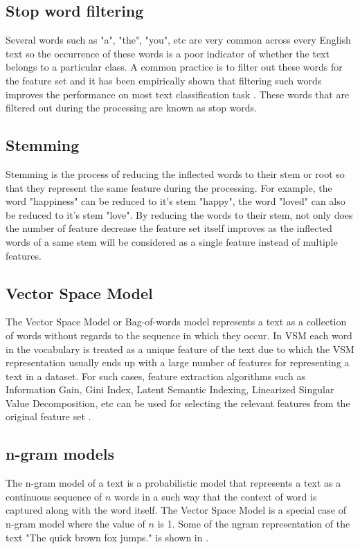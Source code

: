 \subsection{Stop word filtering}
Several words such as "a", "the", "you", etc are very common across every English text so the occurrence of these words is a poor indicator of whether the text belongs to a particular class. A common practice is to filter out these words for the feature set and it has been empirically shown that filtering such words improves the performance on most text classification task \cite{silva2003importance}. These words that are filtered out during the processing are known as stop words. 

\subsection{Stemming}
Stemming is the process of reducing the inflected words to their stem or root so that they represent the same feature during the processing. For example, the word "happiness" can be reduced to it's stem "happy", the word "loved" can also be reduced to it's stem "love". By reducing the words to their stem, not only does the number of feature decrease the feature set itself improves as the inflected words of a same stem will be considered as a single feature instead of multiple features. 

\subsection{Vector Space Model}
The Vector Space Model or Bag-of-words model represents a text as a collection of words without regards to the sequence in which they occur. In VSM each word in the vocabulary is treated as a unique feature of the text due to which the VSM representation usually ends up with a large number of features for representing a text in a dataset. For such cases, feature extraction algorithms such as Information Gain, Gini Index, Latent Semantic Indexing, Linearized Singular Value Decomposition, etc can be used for selecting the relevant features from the original feature set \cite{aggarwal2012survey}.

\subsection{n-gram models}
The n-gram model of a text is a probabilistic model that represents a text as a continuous sequence of $n$ words in a such way that the context of word is captured along with the word itself. The Vector Space Model is a special case of n-gram model where the value of $n$ is 1. Some of the ngram representation of the text "The quick brown fox jumps." is shown in .

